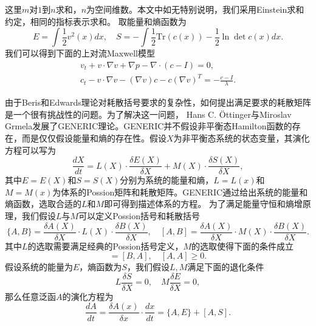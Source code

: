 这里$m$对$1$到$n$求和，$n$为空间维数。本文中如无特别说明，我们采用Einstein求和约定，相同的指标表示求和。
取能量和熵函数为
\begin{equation*}
	E = \int \frac{1}{2} v^2(x)dx, \quad S = -\int \frac{1}{2} \mbox{
 	Tr}(c(x))- \frac{1}{2}  \ln \det c(x) dx.
\end{equation*}
我们可以得到下面的上对流Maxwell模型
\begin{subequations}\label{eq:chap1UCMmaxll}
\begin{align}
	v_t + v \cdot \nabla v + \nabla p  - \nabla \cdot (c - I) = 0, \\
	c_t - v \cdot \nabla v - (\nabla v)c - c (\nabla v)^T = -\frac{c-I}{\lambda}.
\end{align}
\end{subequations}

由于Beris和Edwards理论对耗散括号要求的复杂性，如何提出满足要求的耗散矩阵是一个很有挑战性的问题。为了解决这一问题，
 Hans C. \"Ottinger与Miroslav Grmela发展了GENERIC理论\cite{ottinger2005beyond}。GENERIC并不假设非平衡态Hamilton函数的存在，而是仅仅假设能量和熵的存在性。假设$X$为非平衡态系统的状态变量，其演化方程可以写为
\begin{equation*}
	\frac{dX}{dt} = L(X) \cdot \frac{\delta E(X)}{\delta X} + M(X) \cdot \frac{\delta S(X)}{\delta X} ,
\end{equation*}
其中$E=E(X)$和$S=S(X)$分别为系统的能量和熵，$L=L(x)$和$M=M(x)$为体系的Possion矩阵和耗散矩阵。GENERIC通过给出系统的能量和熵函数，选取合适的$L$和$M$即可得到描述体系的方程。 为了满足能量守恒和熵增原理，我们假设$L$与$M$可以定义Possion括号和耗散括号
\begin{equation*}
	\{ A,B \} = \frac{\delta A(X)}{\delta X} \cdot L(X) \cdot \frac{\delta B(X)}{\delta X}, \quad  [ A,B ] = \frac{\delta A(X)}{\delta X} \cdot M(X) \cdot \frac{\delta B(X)}{\delta X}. 
\end{equation*}
其中$L$的选取需要满足经典的Possion括号定义，$M$的选取使得下面的条件成立
\begin{equation*}
	[A,B] = [B,A], \quad [A,A] \ge 0.
\end{equation*}
假设系统的能量为$E$，熵函数为$S$，我们假设$L,M$满足下面的退化条件
\begin{equation}
	L \frac{\delta S}{\delta X} = 0, \quad M \frac{\delta E}{\delta X} = 0,
\end{equation}
那么任意泛函$A$的演化方程为
 \begin{equation*}
	\frac{d A}{dt} = \frac{\delta A(x)}{\delta x} \cdot \frac{dx}{dt} = \{ A,E\} + [A,S].
\end{equation*}

